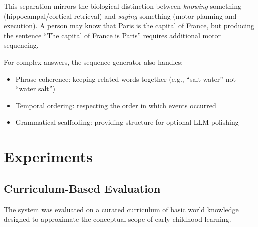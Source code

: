 \documentclass[11pt]{article}
\begin{document}
This separation mirrors the biological distinction between \emph{knowing} something (hippocampal/cortical retrieval) and \emph{saying} something (motor planning and execution). A person may know that Paris is the capital of France, but producing the sentence ``The capital of France is Paris'' requires additional motor sequencing.

For complex answers, the sequence generator also handles:
\begin{itemize}
\item Phrase coherence: keeping related words together (e.g., ``salt water'' not ``water salt'')
\item Temporal ordering: respecting the order in which events occurred
\item Grammatical scaffolding: providing structure for optional LLM polishing
\end{itemize}

\section{Experiments}

\subsection{Curriculum-Based Evaluation}

The system was evaluated on a curated curriculum of basic world knowledge designed
to approximate the conceptual scope of early childhood learning.
\end{document}
